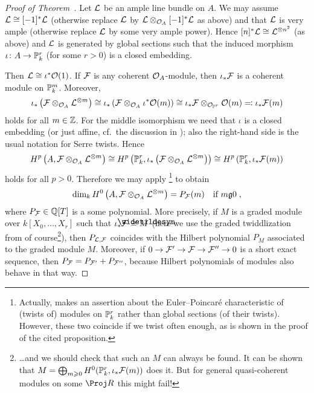 \documentclass[a4paper,parskip=half,numbers=enddot, DIV=12]{scrreprt}
\renewcommand{\geq}{\geqslant}
\begin{document}
\begin{proof}[Proof of Theorem~]
	Let $\mathcal{L}$ be an ample line bundle on $A$. We may assume $\mathcal{L}\cong [-1]^*\mathcal{L}$ (otherwise replace $\mathcal{L}$ by $\mathcal{L}\otimes_{\mathcal{O}_A}[-1]^*\mathcal{L}$ as above) and that $\mathcal{L}$ is very ample (otherwise replace $\mathcal{L}$ by some very ample power). Hence $[n]^*\mathcal{L}\cong \mathcal{L}^{\otimes n^2}$ (as above) and $\mathcal{L}$ is generated by global sections such that the induced morphism $\iota\colon A\morphism\IP_k^r$ (for some $r>0$) is a closed embedding.
	
	Then $\mathcal{L}\cong \iota^*\mathcal{O}(1)$. If $\mathcal{F}$ is any coherent $\mathcal{O}_A$-module, then $\iota_*\mathcal{F}$ is a coherent module on $\mathbb{P}_k^m$. Moreover,
	\begin{align*}
		\iota_*\left(\mathcal{F}\otimes_{\mathcal{O}_A}\mathcal{L}^{\otimes m}\right)\cong \iota_*\left(\mathcal{F}\otimes_{\mathcal{O}_A}\iota^*\mathcal{O}(m)\right)\cong \iota_*\mathcal{F}\otimes_{\mathcal{O}_{\mathbb{P}^r}}\mathcal{O}(m) \eqqcolon\iota_*\mathcal{F}(m)
	\end{align*}
	holds for all $m\in \mathbb{Z}$. For the middle isomorphism we need that $\iota$ is a closed embedding (or just affine, cf.\ the discussion in \cite[Remark~2.2.7]{alggeo2}); also the right-hand side is the usual notation for Serre twists. Hence
	\begin{align*}
		H^p\left(A, \mathcal{F}\otimes_{\mathcal{O}_A}\mathcal{L}^{\otimes m}\right)\cong H^p\left(\mathbb{P}_k^r,\iota_*\left(\mathcal{F}\otimes_{\mathcal{O}_A}\mathcal{L}^{\otimes m}\right)\right)\cong H^p\left(\mathbb{P}_k^r,\iota_*\mathcal{F}(m)\right)
	\end{align*}
	holds for all $p>0$. Therefore we may apply \cite[Proposition~2.2.4]{alggeo2}\footnote{Actually, \cite[Proposition~2.2.4]{alggeo2} makes an assertion about the Euler--Poincaré characteristic of (twists of) modules on $\mathbb{P}_k^r$ rather than global sections (of their twists). However, these two coincide if we twist often enough, as is shown in the proof of the cited proposition.} to obtain
	\begin{align*}
		\dim_k H^0\left(A,\Ff\otimes_{\Oo_A}\Ll^{\otimes m}\right)=P_{\Ff}(m)\quad\text{if }m\gge 0\;,
	\end{align*}
	where $P_{\mathcal{F}}\in\mathbb{Q}[T]$ is a some polynomial. More precisely, if $M$ is a graded module over $k[X_0,\ldots,X_r]$ such that $\iota_*\Ff\cong \snake{M}$ (here we use the graded twiddlization from \cite[Remark~2.2.1]{alggeo2} of course\footnote{\ldots and we should check that such an $M$ can always be found. It can be shown that $M=\bigoplus_{m\geq 0}H^0(\IP_k^r,\iota_*\Ff(m))$ does it. But for general quasi-coherent modules on some $\Proj R$ this might fail!}), then $P_{\mathcal{L},\mathcal{F}}$ coincides with the Hilbert polynomial $P_M$ associated to the graded module $M$. Moreover, if $0\morphism\Ff'\morphism\Ff\morphism\Ff''\morphism 0$ is a short exact sequence, then $P_{\mathcal{F}}=P_{\mathcal{F}'}+P_{\mathcal{F}''}$, because Hilbert polynomials of modules also behave in that way.
	

\end{proof}
\end{document}
